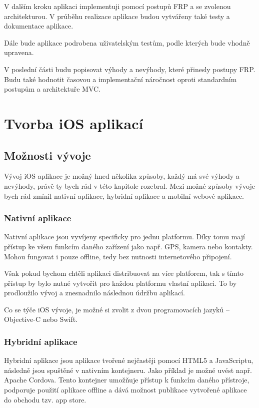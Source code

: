\documentclass[thesis=M,czech]{FITthesis}[2012/06/26]
\begin{document}
V dalším kroku aplikaci implementuji pomocí postupů FRP a se zvolenou architekturou. V průběhu realizace aplikace budou vytvářeny také testy a dokumentace aplikace.

Dále bude aplikace podrobena uživatelským testům, podle kterých bude vhodně upravena.

V poslední části budu popisovat výhody a nevýhody, které přinesly postupy FRP. Budu také hodnotit časovou a implementační náročnost oproti standardním postupům a architektuře MVC. 


\chapter{Tvorba iOS aplikací}

\section{Možnosti vývoje}
Vývoj iOS aplikace je možný hned několika způsoby, každý má své výhody a nevýhody, právě ty bych rád v této kapitole rozebral. Mezi možné způsoby vývoje bych rád zmínil nativní aplikace, hybridní aplikace a mobilní webové aplikace.

\subsection{Nativní aplikace}
Nativní aplikace jsou vyvíjeny specificky pro jednu platformu. Díky tomu mají přístup ke všem funkcím daného zařízení jako např. GPS, kamera nebo kontakty. Mohou fungovat i pouze offline, tedy bez nutnosti internetového připojení. \cite{Nielsen}

Však pokud bychom chtěli aplikaci distribuovat na více platforem, tak s tímto přístup by bylo nutné vytvořit pro každou platformu vlastní aplikaci. To by prodloužilo vývoj a znesnadnilo následnou údržbu aplikací.

Co se týče iOS vývoje, je možné si zvolit z dvou programovacích jazyků -- Objective-C nebo Swift. \cite{objc} \cite{swift}

\subsection{Hybridní aplikace}
Hybridní aplikace jsou aplikace tvořené nejčastěji pomocí HTML5 a JavaScriptu, následně jsou spuštěné v nativním kontejneru. \cite{saleforce} Jako příklad je možné uvést např. Apache Cordova. Tento kontejner umožňuje přístup k funkcím daného přístroje, podporuje použití aplikace offline a dává možnost publikace vytvořené aplikace do obchodu tzv. app store. \cite{cordova}
\end{document}
